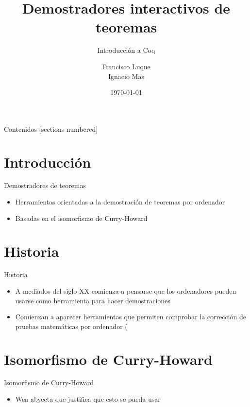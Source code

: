 \documentclass[10pt]{beamer}
\title{Demostradores interactivos de teoremas}
\subtitle{Introducción a Coq}
\date{\today}
\author{Francisco Luque \\ Ignacio Mas}
\institute{Universidad de Granada}
\begin{document}
\maketitle

\begin{frame}{Contenidos}
  [sections numbered]
  \tableofcontents[hideallsubsections]
\end{frame}

\section{Introducción}

\begin{frame}[fragile]{Demostradores de teoremas}

  \begin{itemize}
  \item Herramientas orientadas a la demostración de teoremas por ordenador
  \item Basadas en el isomorfismo de Curry-Howard
  \end{itemize}

\end{frame}

\section{Historia}

\begin{frame}[fragile]{Historia}

  \begin{itemize}
  \item A mediados del siglo XX comienza a pensarse que los ordenadores pueden
    usarse como herramienta para hacer demostraciones
  \item Comienzan a aparecer herramientas que permiten comprobar la corrección
    de pruebas matemáticas por ordenador (
  \end{itemize}

\end{frame}

\section{Isomorfismo de Curry-Howard}

\begin{frame}[fragile]{Isomorfismo de Curry-Howard}

  \begin{itemize}
  \item Wea abyecta que justifica que esto se pueda usar
  \end{itemize}

\end{frame}
\end{document}
